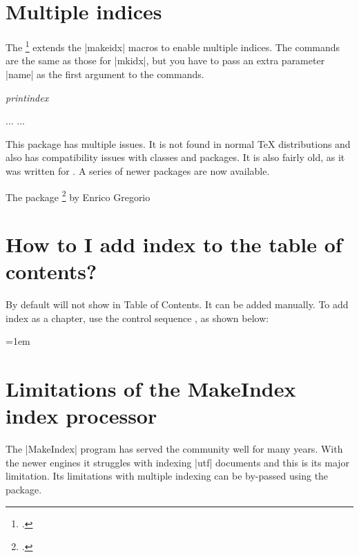 \section{Multiple indices}

The \footcite{multind} extends the |makeidx| macros to enable multiple indices. The commands are the same as those for |mkidx|, but you have to pass an extra parameter |name| as the first argument to the commands.

\emph{printindex}
\begin{phdverbatim}
\usepackage{multind}
...
...
\end{phdverbatim}

This package has multiple issues. It is not found in normal TeX distributions and also has compatibility issues with \AmS classes and packages. It is also fairly old, as it was written for . A series of newer packages are now available.

The package \footcite{imakeidx} by Enrico Gregorio 

\section{How to I add index to the table of contents?}
By default \latexe will not show in Table of Contents. It can be added manually. To add index as a chapter, use the control sequence , as shown below:

\begin{teX}
\clearpage
{}
\printindex
\end{teX}

\begin{teX}
\clearpage
{}
\printindex
\end{teX}

\parindent=1em
\section{Limitations of the MakeIndex index processor}

The |MakeIndex| program has served the \latex community well for many years. With the newer engines it struggles
with indexing |utf| documents and this is its major limitation. Its limitations with multiple indexing can be by-passed
using the  package.

